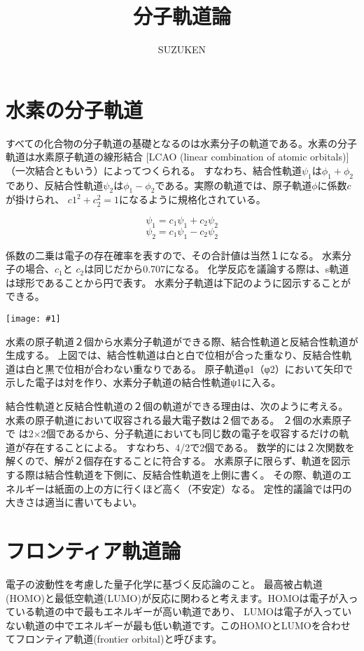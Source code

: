 \documentclass[a4paper,papersize,dvipdfmx]{jsarticle}
\newcommand{\pict}[2]{\begin{center} \texttt{[image: \#1]} \end{center}}   %
\begin{document}
\title{分子軌道論}
\author{SUZUKEN}
\date{}
\maketitle


\section{水素の分子軌道}
すべての化合物の分子軌道の基礎となるのは水素分子の軌道である。水素の分子軌道は水素原子軌道の線形結合
[LCAO (linear combination of atomic orbitals)]（一次結合ともいう）によってつくられる。
すなわち、結合性軌道$\psi_1$は$\phi_1+\phi_2$であり、反結合性軌道$\psi_2$は$\phi_1-\phi_2$である。実際の軌道では、原子軌道$\phi$に係数$c$が掛けられ、 $c1^2+c_2^2=1$になるように規格化されている。

\[
  \psi_1 = c_1 \psi_1 + c_2 \psi_2
\]
\[
  \psi_2 = c_1 \psi_1 - c_2 \psi_2
\]

係数の二乗は電子の存在確率を表すので、その合計値は当然１になる。
水素分子の場合、$c_1$と $c_2$は同じだから0.707になる。
化学反応を議論する際は、s軌道は球形であることから円で表す。
水素分子軌道は下記のように図示することができる。

\pict{image/suiso.png}{12}

水素の原子軌道２個から水素分子軌道ができる際、結合性軌道と反結合性軌道が生成する。
上図では、結合性軌道は白と白で位相が合った重なり、反結合性軌道は白と黒で位相が合わない重なりである。
原子軌道φ1（φ2）において矢印で示した電子は対を作り、水素分子軌道の結合性軌道ψ1に入る。

結合性軌道と反結合性軌道の２個の軌道ができる理由は、次のように考える。
水素の原子軌道において収容される最大電子数は２個である。
２個の水素原子で は2×2個であるから、分子軌道においても同じ数の電子を収容するだけの軌道が存在することによる。
すなわち、4/2で2個である。
数学的には２次関数を 解くので、解が２個存在することに符合する。
水素原子に限らず、軌道を図示する際は結合性軌道を下側に、反結合性軌道を上側に書く。
その際、軌道のエネルギーは紙面の上の方に行くほど高く（不安定）なる。
定性的議論では円の大きさは適当に書いてもよい。

\section{フロンティア軌道論}
電子の波動性を考慮した量子化学に基づく反応論のこと。
最高被占軌道(HOMO)と最低空軌道(LUMO)が反応に関わると考えます。HOMOは電子が入っている軌道の中で最もエネルギーが高い軌道であり、
LUMOは電子が入っていない軌道の中でエネルギーが最も低い軌道です。このHOMOとLUMOを合わせてフロンティア軌道(frontier orbital)と呼びます。
\end{document}

